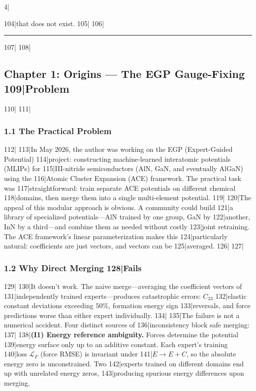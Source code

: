 4|\documentclass[
5|  12pt,
6|]{ctexart}
\begin{document}
104|that does not exist.
105|
106|\begin{center}\rule{0.5\linewidth}{0.5pt}\end{center}
107|
108|\subsection{Chapter 1: Origins --- The EGP Gauge-Fixing
109|Problem}\label{chapter-1-origins-the-egp-gauge-fixing-problem}
110|
111|\subsubsection{1.1 The Practical Problem}\label{the-practical-problem}
112|
113|In May 2026, the author was working on the EGP (Expert-Guided Potential)
114|project: constructing machine-learned interatomic potentials (MLIPs) for
115|III-nitride semiconductors (AlN, GaN, and eventually AlGaN) using the
116|Atomic Cluster Expansion (ACE) framework. The practical task was
117|straightforward: train separate ACE potentials on different chemical
118|domains, then merge them into a single multi-element potential.
119|
120|The appeal of this modular approach is obvious. A community could build
121|a library of specialized potentials---AlN trained by one group, GaN by
122|another, InN by a third---and combine them as needed without costly
123|joint retraining. The ACE framework's linear parameterization makes this
124|particularly natural: coefficients are just vectors, and vectors can be
125|averaged.
126|
127|\subsubsection{1.2 Why Direct Merging
128|Fails}\label{why-direct-merging-fails}
129|
130|It doesn't work. The naive merge---averaging the coefficient vectors of
131|independently trained experts---produces catastrophic errors: \(C_{33}\)
132|elastic constant deviations exceeding \(50\%\), formation energy sign
133|reversals, and force predictions worse than either expert individually.
134|
135|The failure is not a numerical accident. Four distinct sources of
136|inconsistency block safe merging:
137|
138|\textbf{(I1) Energy reference ambiguity.} Forces determine the potential
139|energy surface only up to an additive constant. Each expert's training
140|loss \({\mathcal{L}}_F\) (force RMSE) is invariant under
141|\(E \to E + C\), so the absolute energy zero is unconstrained. Two
142|experts trained on different domains end up with unrelated energy zeros,
143|producing spurious energy differences upon merging.
\end{document}
